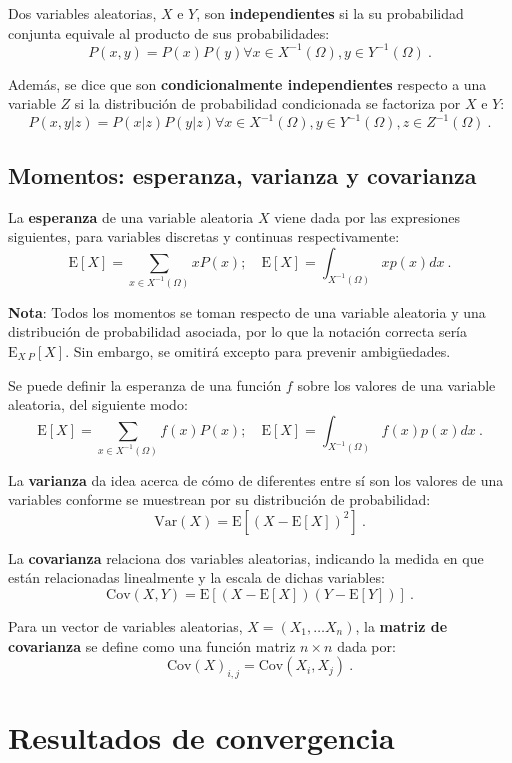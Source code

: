 Dos variables aleatorias, \(X\) e \(Y\), son \textbf{independientes} si
la su probabilidad conjunta equivale al producto de sus probabilidades:
\[P(x,y)=P(x)P(y)\forall x\in X^{-1}(\Omega),y\in Y^{-1}(\Omega)~.\]

Además, se dice que son \textbf{condicionalmente independientes}
respecto a una variable \(Z\) si la distribución de probabilidad
condicionada se factoriza por \(X\) e \(Y\):
\[P(x,y|z)=P(x|z)P(y|z)\forall x\in X^{-1}(\Omega),y\in Y^{-1}(\Omega),z\in Z^{-1}(\Omega)~.\]

\subsection{Momentos: esperanza, varianza y
covarianza}\label{momentos-esperanza-varianza-y-covarianza}

La \textbf{esperanza} de una variable aleatoria \(X\) viene dada por las
expresiones siguientes, para variables discretas y continuas
respectivamente:
\[\mathrm E[X]=\sum_{x\in X^{-1}(\Omega)}xP(x);\quad \mathrm E[X]=\int_{X^{-1}(\Omega)}xp(x)dx~.\]

\textbf{Nota}: Todos los momentos se toman respecto de una variable
aleatoria y una distribución de probabilidad asociada, por lo que la
notación correcta sería \(\mathrm E_{X~P}[X]\). Sin embargo, se omitirá
excepto para prevenir ambigüedades.

Se puede definir la esperanza de una función \(f\) sobre los valores de
una variable aleatoria, del siguiente modo:
\[\mathrm E[X]=\sum_{x\in X^{-1}(\Omega)}f(x)P(x);\quad \mathrm E[X]=\int_{X^{-1}(\Omega)}f(x)p(x)dx~.\]

La \textbf{varianza} da idea acerca de cómo de diferentes entre sí son
los valores de una variables conforme se muestrean por su distribución
de probabilidad: \[\mathrm{Var}(X)=\mathrm E[(X-\mathrm E[X])^2]~.\]

La \textbf{covarianza} relaciona dos variables aleatorias, indicando la
medida en que están relacionadas linealmente y la escala de dichas
variables:
\[\mathrm{Cov}(X, Y)=\mathrm E[(X-\mathrm E[X])(Y-\mathrm E[Y])]~.\]

Para un vector de variables aleatorias, \(X=(X_1, \dots X_n)\), la
\textbf{matriz de covarianza} se define como una función matriz
\(n\times n\) dada por:
\[\mathrm{Cov}(X)_{i,j}=\mathrm{Cov}(X_i, X_j)~.\]

\section{Resultados de convergencia}\label{resultados-de-convergencia}

